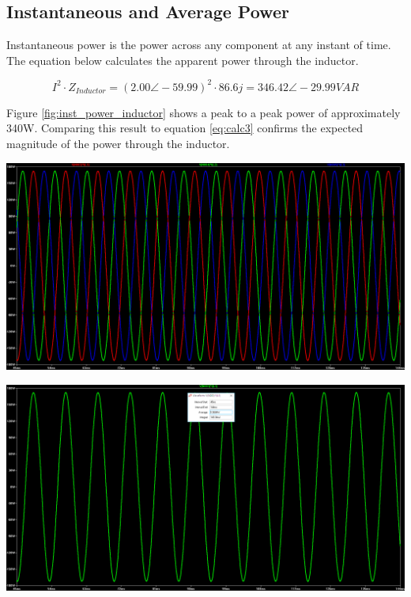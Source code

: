 \documentclass[journal]{IEEEtran}
\begin{document}
\subsection{Instantaneous and Average Power}
\noindent Instantaneous power is the power across any component at any instant of time. The equation below calculates the apparent power through the inductor. 

\begin{equation} 
I^2 \cdot Z_{Inductor} = ({2.00 \angle -59.99})^2 \cdot 86.6j = 346.42 \angle -29.99 VAR
\label{eq:calc3}
\end{equation}

\noindent Figure \ref{fig:inst_power_inductor} shows a peak to a peak power of approximately 340W. Comparing this result to equation \ref{eq:calc3} confirms the expected magnitude of the power through the inductor.

\begingroup
    \centering
    \medskip
    \includegraphics[width=\columnwidth]{images/Lab_9_ss_12.PNG}
    \label{fig:inst_power_inductor}
    \medskip
\endgroup

\begingroup
    \centering
    \medskip
    \includegraphics[width=\columnwidth]{images/Lab_9_ss_17.PNG}
    \label{fig:avg_power_inductor}
    \medskip
\endgroup
\end{document}
